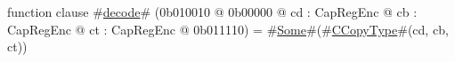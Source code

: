 function clause #\hyperref[zdecode]{decode}# (0b010010 @ 0b00000 @ cd : CapRegEnc @ cb : CapRegEnc @ ct : CapRegEnc @ 0b011110) = #\hyperref[zSome]{Some}#(#\hyperref[zCCopyType]{CCopyType}#(cd, cb, ct))
